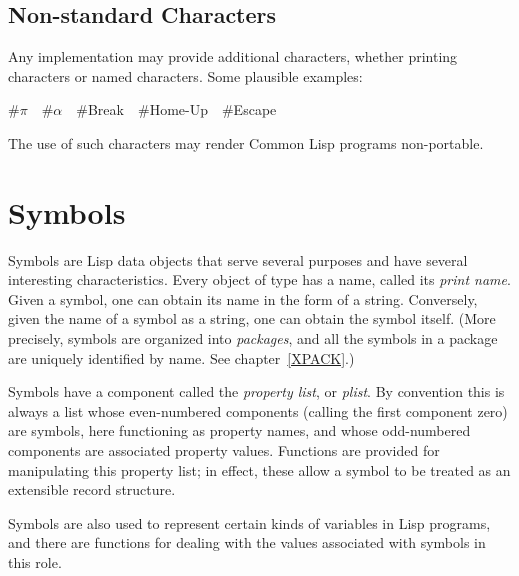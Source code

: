 \subsection{Non-standard Characters}

Any implementation may provide additional characters, whether printing
characters or named characters.  Some plausible examples:

\newpage%

\begin{lisp}
\#{\Xbackslash}$\pi$~~\#{\Xbackslash}$\alpha$~~\#{\Xbackslash}Break~~\#{\Xbackslash}Home-Up~~\#{\Xbackslash}Escape
\end{lisp}
The use of such characters may render Common Lisp programs non-portable.

\section{Symbols}

Symbols are Lisp data objects that serve several purposes
and have several interesting characteristics.  Every object of
type  has a name,
called its \emph{print name}.  Given a symbol, one can
obtain its name in the form of a string.  Conversely,
given the name of a symbol as a string, one can obtain the
symbol itself.  (More precisely, symbols are organized into
\emph{packages}, and all the symbols in a package are uniquely
identified by name.  See chapter~\ref{XPACK}.)

Symbols have a component called the \emph{property list}, or \emph{plist}.
By convention this is always a list whose even-numbered
components (calling the first component zero) are symbols,
here functioning as property names, and whose odd-numbered components
are associated property values.  Functions are provided for manipulating
this property list; in effect, these allow a symbol to be treated as an
extensible record structure.

Symbols are also used to represent certain kinds of variables in Lisp
programs, and there are functions for dealing with the values associated
with symbols in this role. 


